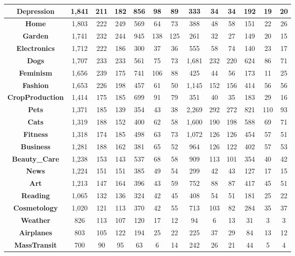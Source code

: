 \begin{table}[t]
{\begin{tabular}{|c||c|c|c||c|c|c||c|c|c||c|c|c|}
\textbf{Depression} & 1,841 & 211 & 182 & 856 & 98 & 89 & 333 & 34 & 34 & 192 & 19 & 20\\ \hline
\textbf{Home} & 1,803 & 222 & 249 & 569 & 64 & 73 & 388 & 48 & 58 & 151 & 22 & 26\\ \hline
\textbf{Garden} & 1,741 & 232 & 244 & 945 & 138 & 125 & 261 & 32 & 27 & 149 & 20 & 15\\ \hline
\textbf{Electronics} & 1,712 & 222 & 186 & 300 & 37 & 36 & 555 & 58 & 74 & 140 & 23 & 17\\ \hline
\textbf{Dogs} & 1,707 & 233 & 233 & 561 & 75 & 73 & 1,681 & 232 & 220 & 624 & 86 & 71\\ \hline
\textbf{Feminism} & 1,656 & 239 & 175 & 741 & 106 & 88 & 425 & 44 & 56 & 173 & 11 & 25\\ \hline
\textbf{Fashion} & 1,653 & 226 & 198 & 457 & 61 & 50 & 1,145 & 152 & 156 & 414 & 56 & 56\\ \hline
\textbf{CropProduction} & 1,414 & 175 & 185 & 699 & 91 & 79 & 351 & 40 & 35 & 183 & 29 & 16\\ \hline
\textbf{Pets} & 1,371 & 185 & 139 & 354 & 43 & 38 & 2,269 & 292 & 272 & 821 & 110 & 93\\ \hline
\textbf{Cats} & 1,319 & 188 & 152 & 400 & 62 & 58 & 1,600 & 190 & 198 & 588 & 69 & 71\\ \hline
\textbf{Fitness} & 1,318 & 174 & 185 & 498 & 63 & 73 & 1,072 & 126 & 126 & 454 & 57 & 51\\ \hline
\textbf{Business} & 1,281 & 188 & 162 & 381 & 65 & 52 & 964 & 126 & 122 & 402 & 57 & 53\\ \hline
\textbf{Beauty\_Care} & 1,238 & 153 & 143 & 537 & 68 & 58 & 909 & 113 & 101 & 354 & 40 & 42\\ \hline
\textbf{News} & 1,224 & 151 & 151 & 385 & 49 & 54 & 299 & 42 & 43 & 127 & 17 & 15\\ \hline
\textbf{Art} & 1,213 & 147 & 164 & 396 & 43 & 59 & 752 & 88 & 87 & 417 & 45 & 51\\ \hline
\textbf{Reading} & 1,065 & 132 & 136 & 324 & 42 & 45 & 408 & 54 & 51 & 181 & 25 & 22\\ \hline
\textbf{Cosmetology} & 1,020 & 121 & 113 & 370 & 42 & 55 & 713 & 103 & 82 & 284 & 35 & 37\\ \hline
\textbf{Weather} & 826 & 113 & 107 & 120 & 17 & 12 & 94 & 6 & 13 & 31 & 3 & 3\\ \hline
\textbf{Airplanes} & 803 & 105 & 122 & 194 & 25 & 22 & 225 & 37 & 29 & 84 & 13 & 12\\ \hline
\textbf{MassTransit} & 700 & 90 & 95 & 63 & 6 & 14 & 242 & 26 & 21 & 44 & 5 & 4\\ \hline

\end{tabular}}
\end{table}
